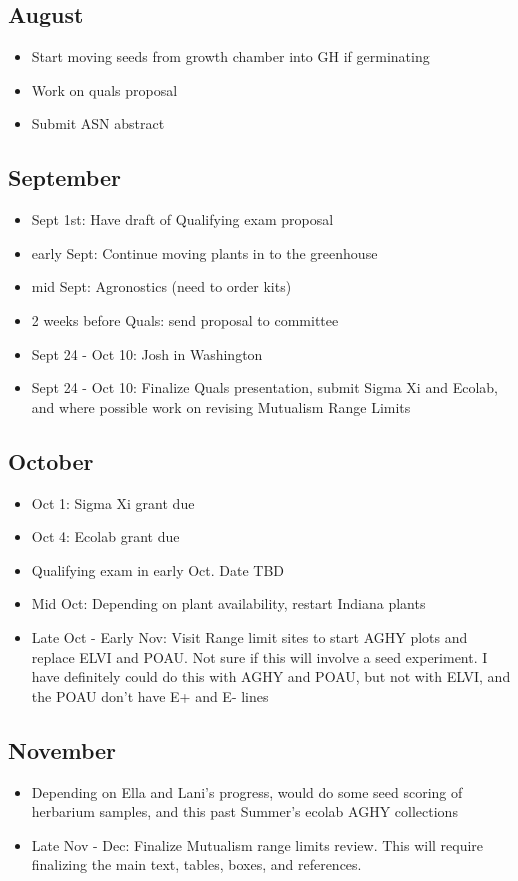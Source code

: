 \documentclass{article}
\begin{document}
\subsection*{August}
\begin{itemize}
\item{Start moving seeds from growth chamber into GH if germinating}
\item{Work on quals proposal}
\item{Submit ASN abstract}
\end{itemize}
\subsection*{September}
\begin{itemize}
\item{Sept 1st: Have draft of Qualifying exam proposal}
\item{early Sept: Continue moving plants in to the greenhouse}
\item{mid Sept: Agronostics (need to order kits)}
\item{2 weeks before Quals: send proposal to committee}
\item{Sept 24 - Oct 10: Josh in Washington}
\item{Sept 24 - Oct 10: Finalize Quals presentation, submit Sigma Xi and Ecolab, and where possible work on revising Mutualism Range Limits}
\end{itemize}
\subsection*{October}
\begin{itemize}
\item{Oct 1: Sigma Xi grant due}
\item{Oct 4: Ecolab grant due}
\item{Qualifying exam in early Oct. Date TBD}
\item{Mid Oct: Depending on plant availability, restart Indiana plants}
\item{Late Oct - Early Nov: Visit Range limit sites to start AGHY plots and replace ELVI and POAU. Not sure if this will involve a seed experiment. I have definitely could do this with AGHY and POAU, but not with ELVI, and the POAU don't have E+ and E- lines}
\end{itemize}
\subsection*{November}
\begin{itemize}
\item{Depending on Ella and Lani's progress, would do some seed scoring of herbarium samples, and this past Summer's ecolab AGHY collections}
\item{Late Nov - Dec: Finalize Mutualism range limits review. This will require finalizing the main text, tables, boxes, and references.}
\end{itemize}
\end{document}
